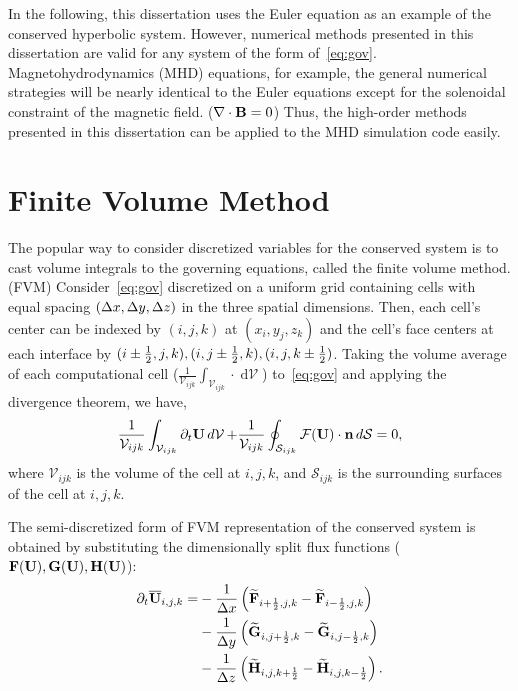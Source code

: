 In the following, this dissertation uses the Euler equation as an example
of the conserved hyperbolic system.
However, numerical methods presented in this dissertation are valid for any system
of the form of~\cref{eq:gov}. Magnetohydrodynamics (MHD) equations, for example,
the general numerical strategies will be nearly identical to the Euler equations
except for the solenoidal constraint of the magnetic field. (\( \nabla \cdot \mathbf{B} = 0 \))
Thus, the high-order methods presented in this dissertation can be applied to the MHD simulation code easily.


\section{Finite Volume Method}\label{sec:fvm}

The popular way to consider discretized variables for the conserved system
is to cast volume integrals to the governing equations, called the finite volume method. (FVM)
Consider~\cref{eq:gov} discretized on a uniform grid containing cells with equal spacing \( (\Delta x, \Delta y, \Delta z) \)
in the three spatial dimensions.
Then, each cell's center can be indexed by \( (i, j, k) \) at \( (x_{i}, y_{j}, z_{k}) \)
and the cell's face centers at each interface by \( (i \pm \frac{1}{2}, j, k), (i, j \pm \frac{1}{2}, k), (i, j, k \pm \frac{1}{2}) \).
Taking the volume average of each computational cell (\( \frac{1}{\mathcal{V}_{ijk}} \int_{\mathcal{V}_{ijk}} \cdot \mathop{d \mathcal{V}}\))
to~\cref{eq:gov} and applying the divergence theorem, we have,
\begin{equation}\label{eq:fvm}
    \frac{1}{\mathcal{V}_{ijk}} \int_{\mathcal{V}_{ijk}} \partial_{t} \mathbf{U} \mathop{d \mathcal{V}}
    + \frac{1}{\mathcal{V}_{ijk}} \oint_{\mathcal{S}_{ijk}} \mathcal{F} (\mathbf{U}) \cdot \mathbf{n} \mathop{d \mathcal{S}} = 0,
\end{equation}
where \( \mathcal{V}_{ijk} \) is the volume of the cell at \( i,j,k \),
and \( \mathcal{S}_{ijk} \) is the surrounding surfaces of the cell at \( i,j,k \).

The semi-discretized form of FVM representation of the conserved system
is obtained by substituting the dimensionally split flux functions
(\( \mathbf{F} (\mathbf{U}), \mathbf{G} (\mathbf{U}), \mathbf{H} (\mathbf{U}) \)):
\begin{equation}\label{eq:fvm_discrete}
    \begin{split}
        \partial_{t} \overline{\mathbf{U}}_{i,j,k} =& - \frac{1}{\Delta x} \left( \widetilde{\mathbf{F}}_{{i+\frac{1}{2}},j,k} - \widetilde{\mathbf{F}}_{{i-\frac{1}{2}},j,k} \right) \\
                                             & - \frac{1}{\Delta y} \left( \widetilde{\mathbf{G}}_{i,{j+\frac{1}{2}},k} - \widetilde{\mathbf{G}}_{i,{j-\frac{1}{2}},k} \right) \\
                                             & - \frac{1}{\Delta z} \left( \widetilde{\mathbf{H}}_{i,j,{k+\frac{1}{2}}} - \widetilde{\mathbf{H}}_{i,j,{k-\frac{1}{2}}} \right).
    \end{split}
\end{equation}

